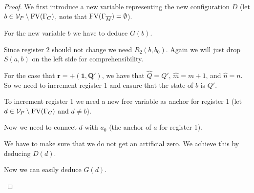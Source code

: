 \begin{proof}
	We first introduce a new variable representing the new configuration $D$ (let $b\in \mathcal{V}_P\setminus\text{FV}(\Gamma_C)$, note that $\text{FV}(\Gamma_{\overline{M}})=\emptyset$).
	
	\begin{figure}[H]
		\centering
		
	\end{figure}
	
	For the new variable $b$ we have to deduce $G(b)$.
	
	\begin{figure}[H]
		\centering
		
	\end{figure}
	
	Since register 2 should not change we need $R_2(b,b_0)$. Again we will just drop $S(a,b)$ on the left side for comprehensibility.
		
	\begin{figure}[H]
		\centering
		
	\end{figure}
	
	For the case that $\boldsymbol{r=+(1,Q')}$, we have that $\widehat{Q}=Q'$, $\widehat{m}=m+1$, and $\widehat{n}=n$. So we need to increment register 1 and ensure that the state of $b$ is $Q'$.
	\begin{figure}[H]
		\centering
		
	\end{figure}
	
	To increment register 1 we need a new free variable as anchor for register 1 (let $d\in\mathcal{V}_P\setminus\text{FV}(\Gamma_C)$ and $d\neq b$).
	
	\begin{figure}[H]
		\centering
		
	\end{figure}
	
	Now we need to connect $d$ with $a_0$ (the anchor of $a$ for register 1).
	
	\begin{figure}[H]
		\centering
		
	\end{figure}
	
	We have to make sure that we do not get an artificial zero. We achieve this by deducing $D(d)$.
	
	\begin{figure}[H]
		\centering
		
	\end{figure}
	
	Now we can easily deduce $G(d)$.
	
	\begin{figure}[H]
		\centering
		
	\end{figure}
	

\end{proof}
